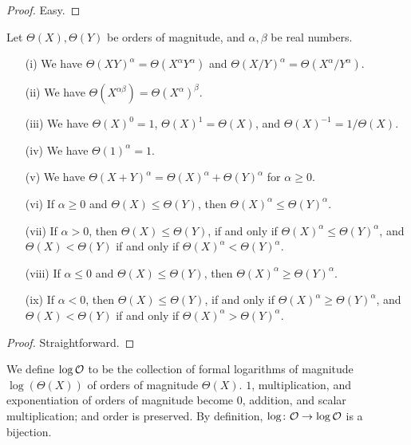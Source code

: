 \begin{proof} Easy.
\end{proof}

\begin{lemma}\label{power-law}  Let $\Theta(X), \Theta(Y)$ be orders of magnitude, and $\alpha,\beta$ be real numbers.
    \begin{itemize}
    \item[(i)] We have $\Theta(XY)^\alpha = \Theta(X^\alpha Y^\alpha)$ and $\Theta(X/Y)^\alpha = \Theta(X^\alpha / Y^\alpha)$.
    \item[(ii)] We have $\Theta(X^{\alpha \beta}) = \Theta(X^\alpha)^\beta$.  
    \item[(iii)] We have $\Theta(X)^0 = 1$, $\Theta(X)^1 = \Theta(X)$, and $\Theta(X)^{-1} = 1 / \Theta(X)$.
    \item[(iv)] We have $\Theta(1)^\alpha = 1$.
    \item[(v)] We have $\Theta(X+Y)^\alpha = \Theta(X)^\alpha + \Theta(Y)^\alpha$ for $\alpha \geq 0$.
    \item[(vi)]  If $\alpha \geq 0$ and $\Theta(X) \leq \Theta(Y)$, then $\Theta(X)^\alpha \leq \Theta(Y)^\alpha$.
    \item[(vii)] If $\alpha > 0$, then $\Theta(X) \leq \Theta(Y)$, if and only if $\Theta(X)^\alpha \leq \Theta(Y)^\alpha$, and $\Theta(X) < \Theta(Y)$ if and only if $\Theta(X)^\alpha < \Theta(Y)^\alpha$.
    \item[(viii)] If $\alpha \leq 0$ and $\Theta(X) \leq \Theta(Y)$, then $\Theta(X)^\alpha \geq \Theta(Y)^\alpha$.
    \item[(ix)] If $\alpha < 0$, then $\Theta(X) \leq \Theta(Y)$, if and only if $\Theta(X)^\alpha \geq \Theta(Y)^\alpha$, and $\Theta(X) < \Theta(Y)$ if and only if $\Theta(X)^\alpha > \Theta(Y)^\alpha$.   
    \end{itemize}
\end{lemma}

\begin{proof} Straightforward.
\end{proof}

\begin{definition} \label{log-order-def}  We define $\log {\mathcal O}$ to be the collection of formal logarithms of magnitude $\log(\Theta(X))$ of orders of magnitude $\Theta(X)$.  $1$, multiplication, and exponentiation of orders of magnitude become $0$, addition, and scalar multiplication; and order is preserved. By definition, $\log \colon {\mathcal O} \to \log {\mathcal O}$ is a bijection.
\end{definition}


